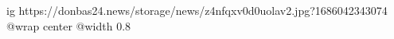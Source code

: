  
 
 
 
 

\ifcmt
  ig https://donbas24.news/storage/news/z4nfqxv0d0uolav2.jpg?1686042343074
  @wrap center
  @width 0.8
\fi
